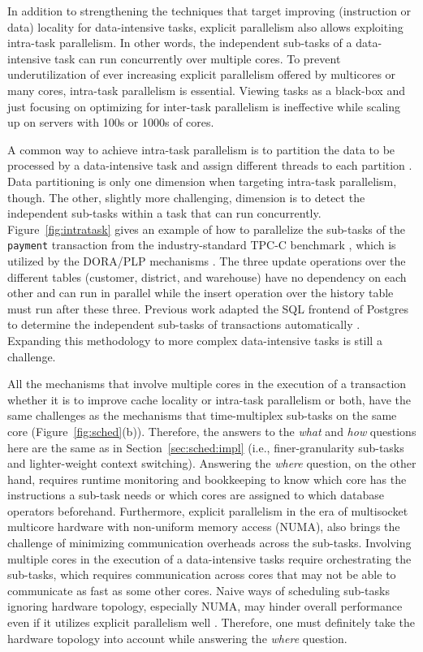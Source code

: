 \documentclass[11pt,dvipdfm]{article}
\newcommand{\reffig}[1]{Figure~\ref{fig:#1}}
\newcommand{\refsec}[1]{Section~\ref{sec:#1}}
\begin{document}
In addition to strengthening the techniques that
target improving (instruction or data) locality for data-intensive tasks,
explicit parallelism also allows exploiting intra-task parallelism.
In other words, 
the independent sub-tasks of a data-intensive task can run concurrently over multiple cores.
To prevent underutilization of ever increasing explicit parallelism offered by multicores or many cores,
intra-task parallelism is essential.
Viewing tasks as a black-box and just focusing on optimizing for inter-task parallelism
is ineffective while scaling up on servers with 100s or 1000s of cores.

A common way to achieve intra-task parallelism is to partition the data to be processed
by a data-intensive task and assign different threads to each partition \cite{LeisBKN14, PsaroudakisSMSA15}.
Data partitioning is only one dimension when targeting intra-task parallelism, though.
The other, slightly more challenging, dimension is to detect the independent sub-tasks
within a task that can run concurrently. 
\reffig{intratask} gives an example of how to parallelize the sub-tasks of the
\texttt{payment} transaction from the industry-standard TPC-C benchmark \cite{TPCC},
which is utilized by the DORA/PLP mechanisms \cite{Pandis+11, PandisTJA11}.
The three update operations over the different tables (customer, district, and warehouse)
have no dependency on each other and can run in parallel
while the insert operation over the history table must run after these three.
Previous work adapted the SQL frontend of Postgres to determine the independent
sub-tasks of transactions automatically \cite{Pandis+11}.
Expanding this methodology to more complex data-intensive tasks is still a challenge.

All the mechanisms that involve multiple cores in the execution of a transaction
whether it is to improve cache locality or intra-task parallelism or both,
have the same challenges as the mechanisms that time-multiplex sub-tasks on the same core (\reffig{sched}(b)).
Therefore, the answers to the \textit{what} and \textit{how} questions here are the same as in \refsec{sched:impl}
(i.e., finer-granularity sub-tasks and lighter-weight context switching).
Answering the \textit{where} question, on the other hand,
requires runtime monitoring and bookkeeping to know which core has the instructions a sub-task needs
or which cores are assigned to which database operators beforehand.
Furthermore,
explicit parallelism in the era of multisocket multicore hardware with non-uniform memory access (NUMA),
also brings the challenge of minimizing communication overheads across the sub-tasks.
Involving multiple cores in the execution of a data-intensive tasks require orchestrating the sub-tasks,
which requires communication across cores that may not be able to communicate as fast as some other cores.
Naive ways of scheduling sub-tasks ignoring hardware topology, especially NUMA,
may hinder overall performance even if it utilizes explicit parallelism well \cite{PorobicLTA14, PsaroudakisSMSA15}.
Therefore, one must definitely take the hardware topology into account while answering the \textit{where} question.
\end{document}
